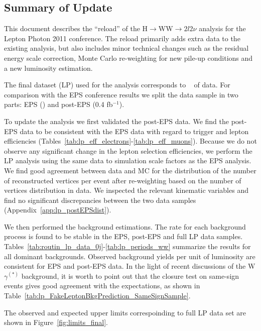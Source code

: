 
\subsection{Summary of Update}
This document describes the ``reload'' of the H$\to$WW$\to2l2\nu$
analysis for the Lepton Photon 2011 conference.  The reload primarily
adds extra data to the existing analysis, but also includes minor
technical changes such as the residual energy scale correction, Monte
Carlo re-weighting for new pile-up conditions and a new luminosity
estimation.

The final dataset (LP) used for the analysis corresponds to \lpintlumi~
of data. For comparison with the EPS conference results we split the
data sample in two parts: EPS (\intlumi) and post-EPS (0.4 fb$^{-1}$).

To update the analysis we first validated the post-EPS data. We find
the post-EPS data to be consistent with the EPS data with regard to
trigger and lepton efficiencies
(Tables~\ref{tab:lp_eff_electrons}-\ref{tab:lp_eff_muons}). Because we
do not observe any significant change in the lepton selection
efficiencies, we perform the LP analysis using the same data to
simulation scale factors as the EPS analysis. We find good agreement
between data and MC for the distribution of the number of
reconstructed vertices per event after re-weighting based on the
number of vertices distribution in data.  We inspected the relevant
kinematic variables and find no significant discrepancies between the
two data samples (Appendix~\ref{app:lp_postEPSdist}).

We then performed the background estimations. The rate for each
background process is found to be stable in the EPS, post-EPS and full
LP data
samples. Tables~\ref{tab:routin_lp_data_0j}-\ref{tab:lp_periods_ww}
summarize the results for all dominant backgrounds. Observed
background yields per unit of luminosity are consistent for EPS
and post-EPS data. In the light of recent discussions of the
W$\gamma^{(*)}$ background, it is worth to point out that the closure
test on same-sign events gives good agreement with the expectations,
as shown in Table~\ref{tab:lp_FakeLeptonBkgPrediction_SameSignSample}.

The observed and expected upper limits correspoinding to full LP data
set are shown in Figure~\ref{fig:limits_final}.

